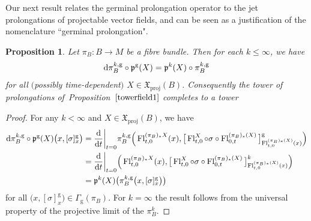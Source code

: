 \documentclass[10pt,a4paper]{amsart}
\numberwithin{equation}{section}
\newtheorem{Proposition}[Theorem]{Proposition}
\def\g{\operatorname{g}}
\def\id{\operatorname{id}}
\def\proj{\operatorname{proj}}
\def\Fl{\operatorname{Fl}}
\def\XF{{\mathfrak{X}}}
\def\pf{{\mathfrak{p}}}
\begin{document}
Our next result relates the germinal prolongation operator to the jet prolongations of projectable vector fields, and can be seen as a justification of the nomenclature ``germinal prolongation".

\begin{Proposition}\label{germprol}
Let $\pi_{B}\colon B\rightarrow M$ be a fibre bundle. Then for each $k\leq\infty$, we have
\begin{gather*}
{\rm d}\pi_{B}^{k,\g}\circ \pf^{\g}(X) = \pf^{k}(X)\circ\pi_{B}^{k,\g}
\end{gather*}
for all $($possibly time-dependent$)$ $X\in\XF_{\proj}(B)$. Consequently the tower of prolongations of~Pro\-po\-si\-tion~$\ref{towerfield1}$ completes to a tower
\begin{center}
\end{center}
\end{Proposition}

\begin{proof}
For any $k<\infty$ and $X\in\XF_{\proj}(B)$, we have
\begin{align*}
{\rm d}\pi_{B}^{k,\g}\circ\pf^{\g}(X)\big(x,[\sigma]^{\g}_{x}\big)
&= \frac{\rm d}{{\rm d}t}\bigg|_{t=0}\pi_{B}^{k,\g}\Big(\Fl^{(\pi_{B})_{*}X}_{t,0}(x),
\big[\Fl^{X}_{t,0}\circ\sigma\circ\Fl^{(\pi_{B})_{*}(X)}_{0,t}\big]^{\g}_{\Fl_{t,0}^{(\pi_{B})_{*}(X)}(x)}\Big)
\\
&= \frac{\rm d}{{\rm d}t}\bigg|_{t=0}\Big(\Fl^{(\pi_{B})_{*}X}_{t,0}(x), \big[\Fl^{X}_{t,0}\circ\sigma\circ\Fl^{(\pi_{B})_{*}(X)}_{0,t}\big]^{k}_{\Fl^{(\pi_{B})_{*}(X)}_{t,0}(x)}\Big)
\\
&= \pf^{k}(X)\big(\pi_{B}^{k,\g}\big(x,[\sigma]^{\g}_{x}\big)\big)
\end{align*}
for all $\big(x,[\sigma]^{\g}_{x}\big)\in\Gamma_{\g}(\pi_{B})$. For $k=\infty$ the result follows from the universal property of the projective limit of the $\pi_{B}^{k}$.
\end{proof}
\end{document}
